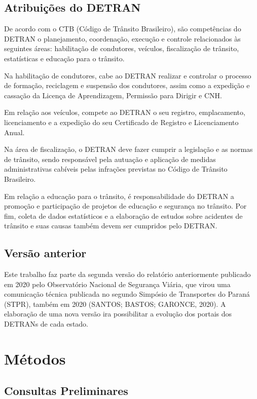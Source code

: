 \documentclass[
  a4paper,
]{article}
\begin{document}
\subsection{Atribuições do DETRAN}\label{atribuiuxe7uxf5es-do-detran}

De acordo com o CTB (Código de Trânsito Brasileiro), são competências do
DETRAN o planejamento, coordenação, execução e controle relacionados às
seguintes áreas: habilitação de condutores, veículos, fiscalização de
trânsito, estatísticas e educação para o trânsito.

Na habilitação de condutores, cabe ao DETRAN realizar e controlar o
processo de formação, reciclagem e suspensão dos condutores, assim como
a expedição e cassação da Licença de Aprendizagem, Permissão para
Dirigir e CNH.

Em relação aos veículos, compete ao DETRAN o seu registro, emplacamento,
licenciamento e a expedição do seu Certificado de Registro e
Licenciamento Anual.

Na área de fiscalização, o DETRAN deve fazer cumprir a legislação e as
normas de trânsito, sendo responsável pela autuação e aplicação de
medidas administrativas cabíveis pelas infrações previstas no Código de
Trânsito Brasileiro.

Em relação a educação para o trânsito, é responsabilidade do DETRAN a
promoção e participação de projetos de educação e segurança no trânsito.
Por fim, coleta de dados estatísticos e a elaboração de estudos sobre
acidentes de trânsito e suas causas também devem ser cumpridos pelo
DETRAN.

\subsection{Versão anterior}\label{versuxe3o-anterior}

Este trabalho faz parte da segunda versão do relatório anteriormente
publicado em 2020 pelo Observatório Nacional de Segurança Viária, que
virou uma comunicação técnica publicada no segundo Simpósio de
Transportes do Paraná (STPR), também em 2020 (SANTOS; BASTOS; GARONCE,
2020). A elaboração de uma nova versão ira possibilitar a evolução dos
portais dos DETRANs de cada estado.

\section{Métodos}\label{sec-metodos}

\subsection{Consultas Preliminares}\label{consultas-preliminares}
\end{document}
